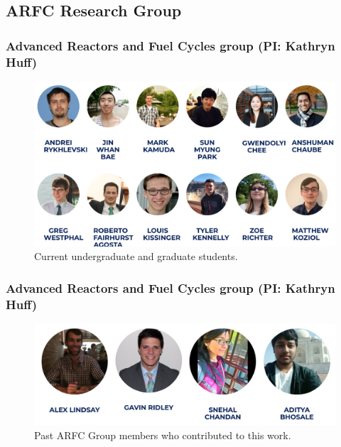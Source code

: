 \subsection{ARFC Research Group}
\begin{frame}
  \frametitle{Advanced Reactors and Fuel Cycles group (PI: Kathryn Huff)}
               \begin{figure}[t]
                \vspace*{-0.1in}
                \includegraphics[width=\textwidth]{./images/arfc1.png}
                       \caption{Current undergraduate and graduate students.}
               \end{figure}            
\end{frame}
\begin{frame}
  \frametitle{Advanced Reactors and Fuel Cycles group (PI: Kathryn Huff)}
               \begin{figure}[t]
                \vspace*{-0.1in}
                \includegraphics[width=\textwidth]{./images/arfc-alums.png}
                       \caption{Past ARFC Group members who contributed to this work.}
               \end{figure}            
\end{frame}

